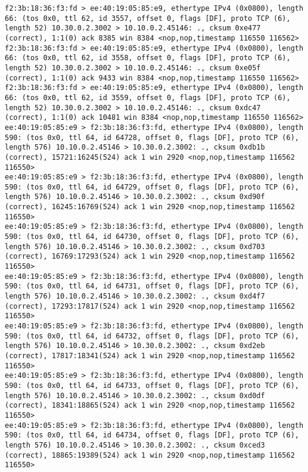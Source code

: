 \documentclass[a4paper,12pt]{article}
\begin{document}
\begin{Verbatim}
f2:3b:18:36:f3:fd > ee:40:19:05:85:e9, ethertype IPv4 (0x0800), length 66: (tos 0x0, ttl 62, id 3557, offset 0, flags [DF], proto TCP (6), length 52) 10.30.0.2.3002 > 10.10.0.2.45146: ., cksum 0xe477 (correct), 1:1(0) ack 8385 win 8384 <nop,nop,timestamp 116550 116562>
f2:3b:18:36:f3:fd > ee:40:19:05:85:e9, ethertype IPv4 (0x0800), length 66: (tos 0x0, ttl 62, id 3558, offset 0, flags [DF], proto TCP (6), length 52) 10.30.0.2.3002 > 10.10.0.2.45146: ., cksum 0xe05f (correct), 1:1(0) ack 9433 win 8384 <nop,nop,timestamp 116550 116562>
f2:3b:18:36:f3:fd > ee:40:19:05:85:e9, ethertype IPv4 (0x0800), length 66: (tos 0x0, ttl 62, id 3559, offset 0, flags [DF], proto TCP (6), length 52) 10.30.0.2.3002 > 10.10.0.2.45146: ., cksum 0xdc47 (correct), 1:1(0) ack 10481 win 8384 <nop,nop,timestamp 116550 116562>
ee:40:19:05:85:e9 > f2:3b:18:36:f3:fd, ethertype IPv4 (0x0800), length 590: (tos 0x0, ttl 64, id 64728, offset 0, flags [DF], proto TCP (6), length 576) 10.10.0.2.45146 > 10.30.0.2.3002: ., cksum 0xdb1b (correct), 15721:16245(524) ack 1 win 2920 <nop,nop,timestamp 116562 116550>
ee:40:19:05:85:e9 > f2:3b:18:36:f3:fd, ethertype IPv4 (0x0800), length 590: (tos 0x0, ttl 64, id 64729, offset 0, flags [DF], proto TCP (6), length 576) 10.10.0.2.45146 > 10.30.0.2.3002: ., cksum 0xd90f (correct), 16245:16769(524) ack 1 win 2920 <nop,nop,timestamp 116562 116550>
ee:40:19:05:85:e9 > f2:3b:18:36:f3:fd, ethertype IPv4 (0x0800), length 590: (tos 0x0, ttl 64, id 64730, offset 0, flags [DF], proto TCP (6), length 576) 10.10.0.2.45146 > 10.30.0.2.3002: ., cksum 0xd703 (correct), 16769:17293(524) ack 1 win 2920 <nop,nop,timestamp 116562 116550>
ee:40:19:05:85:e9 > f2:3b:18:36:f3:fd, ethertype IPv4 (0x0800), length 590: (tos 0x0, ttl 64, id 64731, offset 0, flags [DF], proto TCP (6), length 576) 10.10.0.2.45146 > 10.30.0.2.3002: ., cksum 0xd4f7 (correct), 17293:17817(524) ack 1 win 2920 <nop,nop,timestamp 116562 116550>
ee:40:19:05:85:e9 > f2:3b:18:36:f3:fd, ethertype IPv4 (0x0800), length 590: (tos 0x0, ttl 64, id 64732, offset 0, flags [DF], proto TCP (6), length 576) 10.10.0.2.45146 > 10.30.0.2.3002: ., cksum 0xd2eb (correct), 17817:18341(524) ack 1 win 2920 <nop,nop,timestamp 116562 116550>
ee:40:19:05:85:e9 > f2:3b:18:36:f3:fd, ethertype IPv4 (0x0800), length 590: (tos 0x0, ttl 64, id 64733, offset 0, flags [DF], proto TCP (6), length 576) 10.10.0.2.45146 > 10.30.0.2.3002: ., cksum 0xd0df (correct), 18341:18865(524) ack 1 win 2920 <nop,nop,timestamp 116562 116550>
ee:40:19:05:85:e9 > f2:3b:18:36:f3:fd, ethertype IPv4 (0x0800), length 590: (tos 0x0, ttl 64, id 64734, offset 0, flags [DF], proto TCP (6), length 576) 10.10.0.2.45146 > 10.30.0.2.3002: ., cksum 0xced3 (correct), 18865:19389(524) ack 1 win 2920 <nop,nop,timestamp 116562 116550>

\end{Verbatim}
\end{document}
